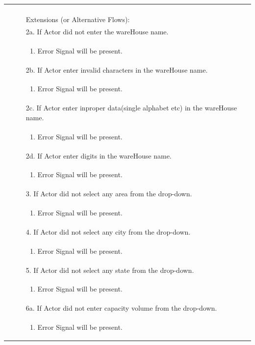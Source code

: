 \documentclass[12pt,a4paper]{article}
\begin{document}
\begin{longtable}{| p{3cm}|p{12cm}|}
\begin{enumerate}
\end{enumerate}\\
&Extensions (or Alternative Flows):\\
& 2a. If Actor did not enter the wareHouse name. \\
& \begin{enumerate}
		\item Error Signal will be present.
	\end{enumerate}
\\
& 2b. If Actor enter invalid characters in the wareHouse name. \\
& \begin{enumerate}
		\item Error Signal will be present.
	\end{enumerate}
\\ 
& 2c. If Actor enter inproper data(single alphabet etc) in the wareHouse name. \\
& \begin{enumerate}
		\item Error Signal will be present.
	\end{enumerate}
\\ 
& 2d. If Actor enter digits in the wareHouse name. \\
& \begin{enumerate}
		\item Error Signal will be present.
	\end{enumerate}
\\ 

& 3. If Actor did not select any area from the drop-down. \\
& \begin{enumerate}
		\item Error Signal will be present.
	\end{enumerate}
\\ 

&  4. If Actor did not select any city from the drop-down. \\
& \begin{enumerate}
		\item Error Signal will be present.
	\end{enumerate}
\\ 
&  5. If Actor did not select any state from the drop-down. \\
& \begin{enumerate}
		\item Error Signal will be present.
	\end{enumerate}
\\
&  6a. If Actor did not enter capacity volume  from the drop-down. \\
& \begin{enumerate}
		\item Error Signal will be present.
	\end{enumerate}
\\


\end{longtable}
\end{document}
